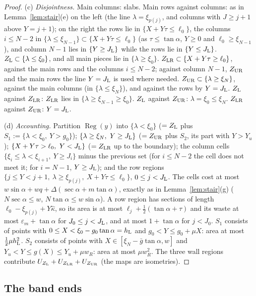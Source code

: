 \documentclass[11pt]{amsart}
\newcommand{\Reg}{\operatorname{Reg}}
\newcommand{\sa}{\sin\alpha}
\newcommand{\ta}{\tan\alpha}
\newcommand{\se}{\sec\alpha}
\theoremstyle{definition}
\theoremstyle{remark}
\numberwithin{equation}{section}
\begin{document}
\begin{proof}
(c) \emph{Disjointness.} Main columns: slabs. Main rows against columns: as in Lemma~\ref{lem:stair}(e) on the left (the
line $\lambda=\xi_{p(j)}$, and columns with $J\ge j+1$ above $Y=j+1$); on the right the rows lie in
$\{X+Y\tau\le\ell_0\}$, the columns $i\le N-2$ in $\{\lambda\le\xi_{N-1}\}\subset\{X+Y\tau\le\ell_0\}$ (as $\tau\le\ta$,
$Y\ge0$ and $\ell_0\ge\xi_{N-1}$), and column $N-1$ lies in $\{Y\ge J_{\rm L}\}$ while the rows lie in $\{Y\le J_{\rm L}\}$.
$Z_{\rm L}\subset\{\lambda\le\xi_0\}$, and all main pieces lie in $\{\lambda\ge\xi_0\}$. $Z_{\rm LR}\subset\{X+Y\tau\ge
\ell_0\}$, against the main rows and the columns $i\le N-2$; against column $N-1$, $Z_{\rm UR}$ and the main rows the line
$Y=J_{\rm L}$ is used where needed. $Z_{\rm UR}\subset\{\lambda\ge\xi_N\}$, against the main columns (in
$\{\lambda\le\xi_N\}$), and against the rows by $Y=J_{\rm L}$. $Z_{\rm L}$ against $Z_{\rm LR}$: $Z_{\rm LR}$ lies in
$\{\lambda\ge\xi_{N-1}\ge\xi_0\}$. $Z_{\rm L}$ against $Z_{\rm UR}$: $\lambda=\xi_0\le\xi_N$. $Z_{\rm LR}$ against
$Z_{\rm UR}$: $Y=J_{\rm L}$.

(d) \emph{Accounting.} Partition $\Reg(y)$ into $\{\lambda<\xi_0\}$ ($=Z_{\rm L}$ plus
$S_1:=\{\lambda<\xi_0,\ Y>g_0\}$); $\{\lambda\ge\xi_N,\ Y\ge J_{\rm L}\}$ ($=Z_{\rm UR}$ plus $S_2$, its part with
$Y>Y_u$); $\{X+Y\tau>\ell_0,\ Y<J_{\rm L}\}$ ($=Z_{\rm LR}$ up to the boundary); the column cells
$\{\xi_i\le\lambda<\xi_{i+1},\ Y\ge J_i\}$ minus the previous set (for $i\le N-2$ the cell does not meet it; for $i=N-1$,
$Y\ge J_{\rm L}$); and the row regions $\{j\le Y<j+1,\ \lambda\ge\xi_{p(j)},\ X+Y\tau\le\ell_0\}$, $0\le j<J_{\rm L}$. The
cells cost at most $w\sa+wq+\Delta(\se+m\ta)$, exactly as in Lemma~\ref{lem:stair}(g) ($N\se\le w$, $N\ta\le w\sa$). A row
region has sections of length $\ell_0-\xi_{p(j)}+Y\hat\kappa$, so its area is at most $\ell_j+\frac12(\ta+\tau)$ and its
waste at most $\varepsilon_m+\ta$ for $J_0\le j<J_{\rm L}$, and at most $1+\ta$ for $j<J_0$. $S_1$ consists of points with
$0\le X<\xi_0-g_0\ta=h_{\rm L}$ and $g_0<Y\le g_0+\mu X$: area at most $\frac12\mu h_{\rm L}^2$. $S_2$ consists of points with
$X\in[\xi_N-\bar g\ta,w]$ and $Y_u<Y\le g(X)\le Y_u+\mu w_R$: area at most $\mu w_R^2$. The three wall regions contribute
$U_{Z_{\rm L}}+U_{Z_{\rm LR}}+U_{Z_{\rm UR}}$ (the maps are isometries).
\end{proof}

\subsection{The band ends}\label{ssec:b35}
\end{document}
